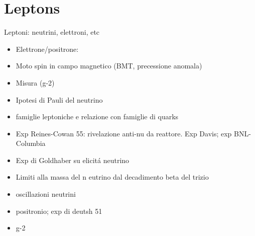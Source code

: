 \documentclass[10pt,xcolor={usenames},fleqn,mathserif,serif]{beamer}
\begin{document}
\part{Leptons}
\begin{wordonframe}{Leptoni: neutrini, elettroni, etc}
\begin{itemize}
\item Elettrone/positrone:
\item Moto spin in campo magnetico (BMT, precessione anomala)
\item Misura (g-2)
\item Ipotesi di Pauli del neutrino
\item famiglie leptoniche e relazione con famiglie di quarks
\item Exp Reines-Cowan 55: rivelazione anti-nu da reattore. Exp Davis; exp BNL-Columbia
\item Exp di Goldhaber su elicit\'a neutrino
\item Limiti alla massa del n eutrino dal decadimento beta del trizio 
\item oscillazioni neutrini
\item positronio; exp di deutsh 51
\item g-2
\end{itemize}
\end{wordonframe}
%
\end{document}

